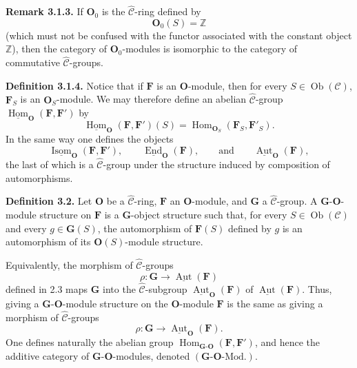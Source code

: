 \medskip
\noindent\textbf{Remark 3.1.3.}
If \(\mathbf O_0\) is the \(\widehat{\mathscr C}\)-ring defined by
\[
  \mathbf O_0(S)=\mathbb Z
\]
(which must not be confused with the functor associated with the constant
object \(\mathbb Z\)), then the category of \(\mathbf O_0\)-modules is
isomorphic to the category of commutative
\(\widehat{\mathscr C}\)-groups.

\medskip
\noindent\textbf{Definition 3.1.4.}
Notice that if \(\mathbf F\) is an \(\mathbf O\)-module, then for every
\(S\in\operatorname{Ob}(\mathscr C)\), \(\mathbf F_S\) is an
\(\mathbf O_S\)-module. We may therefore define an abelian
\(\widehat{\mathscr C}\)-group
\(\underline{\operatorname{Hom}}_{\mathbf O}(\mathbf F,\mathbf F')\) by
\[
  \underline{\operatorname{Hom}}_{\mathbf O}(\mathbf F,\mathbf F')(S)
    =\operatorname{Hom}_{\mathbf O_S}(\mathbf F_S,\mathbf F'_S).
\]
In the same way one defines the objects
\[
  \underline{\operatorname{Isom}}_{\mathbf O}(\mathbf F,\mathbf F'),
  \qquad
  \underline{\operatorname{End}}_{\mathbf O}(\mathbf F),
  \qquad\text{and}\qquad
  \underline{\operatorname{Aut}}_{\mathbf O}(\mathbf F),
\]
the last of which is a \(\widehat{\mathscr C}\)-group under the structure
induced by composition of automorphisms.

\medskip
\noindent\textbf{Definition 3.2.}
Let \(\mathbf O\) be a \(\widehat{\mathscr C}\)-ring,
\(\mathbf F\) an \(\mathbf O\)-module, and \(\mathbf G\) a
\(\widehat{\mathscr C}\)-group. A \(\mathbf G\)-\(\mathbf O\)-module
structure on \(\mathbf F\) is a \(\mathbf G\)-object structure such that,
for every \(S\in\operatorname{Ob}(\mathscr C)\) and every
\(g\in\mathbf G(S)\), the automorphism of \(\mathbf F(S)\) defined by
\(g\) is an automorphism of its \(\mathbf O(S)\)-module structure.

Equivalently, the morphism of \(\widehat{\mathscr C}\)-groups
\[
  \rho:\mathbf G\longrightarrow
    \underline{\operatorname{Aut}}(\mathbf F)
\]
defined in 2.3 maps \(\mathbf G\) into the
\(\widehat{\mathscr C}\)-subgroup
\(\underline{\operatorname{Aut}}_{\mathbf O}(\mathbf F)\) of
\(\underline{\operatorname{Aut}}(\mathbf F)\). Thus, giving a
\(\mathbf G\)-\(\mathbf O\)-module structure on the
\(\mathbf O\)-module \(\mathbf F\) is the same as giving a morphism of
\(\widehat{\mathscr C}\)-groups
\[
  \rho:\mathbf G\longrightarrow
    \underline{\operatorname{Aut}}_{\mathbf O}(\mathbf F).
\]
One defines naturally the abelian group
\(\operatorname{Hom}_{\mathbf G\text{-}\mathbf O}
  (\mathbf F,\mathbf F')\), and hence the additive category of
\(\mathbf G\)-\(\mathbf O\)-modules, denoted
\((\mathbf G\text{-}\mathbf O\text{-Mod.})\).

